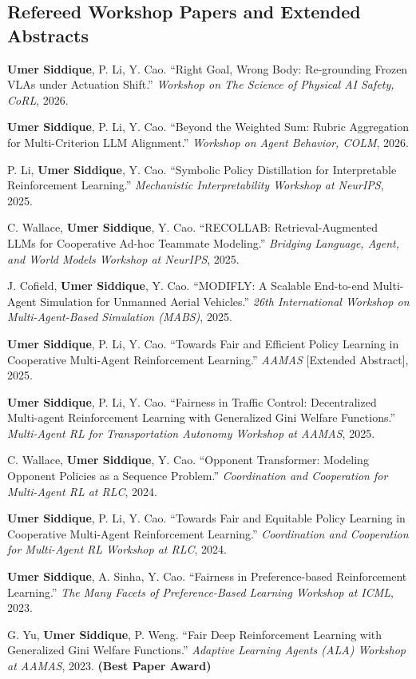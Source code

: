 \documentclass[letterpaper,11pt]{article}
\begin{document}
\subsection*{Refereed Workshop Papers and Extended Abstracts}
\begin{publist}[label={[W\arabic*]}]
    \item \textbf{Umer Siddique}, P. Li, Y. Cao. ``Right Goal, Wrong Body: Re-grounding Frozen VLAs under Actuation Shift.'' \textit{Workshop on The Science of Physical AI Safety, CoRL}, 2026.
    \item \textbf{Umer Siddique}, P. Li, Y. Cao. ``Beyond the Weighted Sum: Rubric Aggregation for Multi-Criterion LLM Alignment.'' \textit{Workshop on Agent Behavior, COLM}, 2026.
    \item P. Li, \textbf{Umer Siddique}, Y. Cao. ``Symbolic Policy Distillation for Interpretable Reinforcement Learning.'' \textit{Mechanistic Interpretability Workshop at NeurIPS}, 2025.
    \item C. Wallace, \textbf{Umer Siddique}, Y. Cao. ``RECOLLAB: Retrieval-Augmented LLMs for Cooperative Ad-hoc Teammate Modeling.'' \textit{Bridging Language, Agent, and World Models Workshop at NeurIPS}, 2025.
    \item J. Cofield, \textbf{Umer Siddique}, Y. Cao. ``MODIFLY: A Scalable End-to-end Multi-Agent Simulation for Unmanned Aerial Vehicles.'' \textit{26th International Workshop on Multi-Agent-Based Simulation (MABS)}, 2025.
    \item \textbf{Umer Siddique}, P. Li, Y. Cao. ``Towards Fair and Efficient Policy Learning in Cooperative Multi-Agent Reinforcement Learning.'' \textit{AAMAS} [Extended Abstract], 2025.
    \item \textbf{Umer Siddique}, P. Li, Y. Cao. ``Fairness in Traffic Control: Decentralized Multi-agent Reinforcement Learning with Generalized Gini Welfare Functions.'' \textit{Multi-Agent RL for Transportation Autonomy Workshop at AAMAS}, 2025.
    \item C. Wallace, \textbf{Umer Siddique}, Y. Cao. ``Opponent Transformer: Modeling Opponent Policies as a Sequence Problem.'' \textit{Coordination and Cooperation for Multi-Agent RL at RLC}, 2024.
    \item \textbf{Umer Siddique}, P. Li, Y. Cao. ``Towards Fair and Equitable Policy Learning in Cooperative Multi-Agent Reinforcement Learning.'' \textit{Coordination and Cooperation for Multi-Agent RL Workshop at RLC}, 2024.
    \item \textbf{Umer Siddique}, A. Sinha, Y. Cao. ``Fairness in Preference-based Reinforcement Learning.'' \textit{The Many Facets of Preference-Based Learning Workshop at ICML}, 2023.
    \item G. Yu, \textbf{Umer Siddique}, P. Weng. ``Fair Deep Reinforcement Learning with Generalized Gini Welfare Functions.'' \textit{Adaptive Learning Agents (ALA) Workshop at AAMAS}, 2023. \textbf{(Best Paper Award)}
\end{publist}
\end{document}

